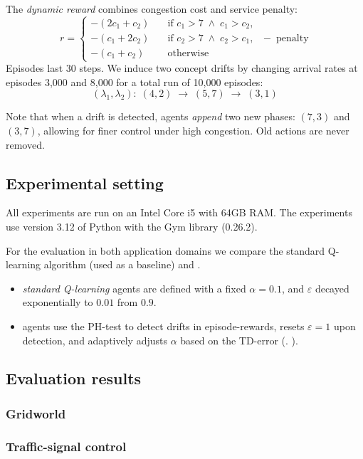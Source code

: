 The \emph{dynamic reward} combines congestion cost and service penalty:
\[
r = 
\begin{cases}
-(2c_1 + c_2)\quad &\text{if }c_1>7 \;\wedge\;c_1>c_2,\\
-(c_1 + 2c_2)\quad &\text{if }c_2>7 \;\wedge\;c_2>c_1,\\
-(c_1 + c_2)\quad &\text{otherwise}
\end{cases}
\;-\;\mathrm{penalty}\,
\]
Episodes last 30 steps. We induce two concept drifts by changing arrival rates at episodes 3,000 and 8,000 for a total run of 10,000 episodes:
\[
(\lambda_1,\lambda_2):
\;(4,2)\;\to\;(5,7)\;\to\;(3,1)
\]

Note that when a drift is detected, agents \emph{append} two new phases:
$(7,3)$ and $(3,7)$, allowing for finer control under high congestion. Old actions are never removed.

\subsection{Experimental setting}
All experiments are run on an Intel Core i5 with 64GB RAM. The experiments use version 3.12 of Python with the Gym library (0.26.2). 

For the evaluation in both application domains we compare the standard Q-learning algorithm (used as a baseline) and \adaptiverl.
\begin{itemize}
  \item \emph{standard Q-learning} agents are defined with a fixed $\alpha=0.1$, and $\varepsilon$ decayed exponentially to $0.01$ from $0.9$.
  \item \adaptiverl agents use the PH-test to detect drifts in episode-rewards, resets $\varepsilon\!=\!1$ upon detection, and adaptively adjusts $\alpha$ based on the TD-error (\cf. ).  
\end{itemize}

\subsection{Evaluation results}

\subsubsection{Gridworld}


\subsubsection{Traffic-signal control}

